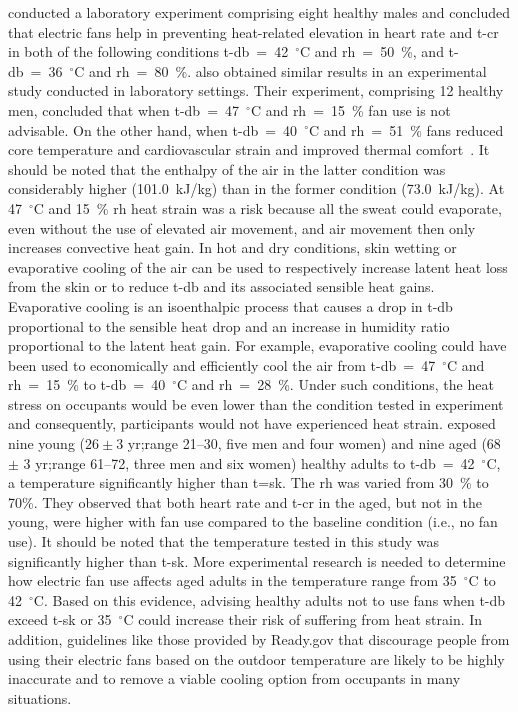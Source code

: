 conducted a laboratory experiment comprising eight healthy males and concluded that electric fans help in preventing heat-related elevation in heart rate and \ac{t-cr} in both of the following conditions \ac{t-db}~=~42~$^{\circ}$C and \ac{rh}~=~50~\%, and \ac{t-db}~=~36~$^{\circ}$C and \ac{rh}~=~80~\%.
 also obtained similar results in an experimental study conducted in laboratory settings.
Their experiment, comprising 12 healthy men, concluded that when \ac{t-db}~=~47~$^{\circ}$C and \ac{rh}~=~15~\% fan use is not advisable.
On the other hand, when \ac{t-db}~=~40~$^{\circ}$C and \ac{rh}~=~51~\% fans reduced core temperature and cardiovascular strain and improved thermal comfort~\cite{Morris2019}.
It should be noted that the enthalpy of the air in the latter condition was considerably higher (101.0~kJ/kg) than in the former condition (73.0~kJ/kg).
At 47~$^{\circ}$C and 15~\% \ac{rh} heat strain was a risk because all the sweat could evaporate, even without the use of elevated air movement, and air movement then only increases convective heat gain.
In hot and dry conditions, skin wetting or evaporative cooling of the air can be used to respectively increase latent heat loss from the skin or to reduce \ac{t-db} and its associated sensible heat gains.
Evaporative cooling is an isoenthalpic process that causes a drop in \ac{t-db} proportional to the sensible heat drop and an increase in humidity ratio proportional to the latent heat gain.
For example, evaporative cooling could have been used to economically and efficiently cool the air from \ac{t-db}~=~47~$^{\circ}$C and \ac{rh}~=~15~\% to \ac{t-db}~=~40~$^{\circ}$C and \ac{rh}~=~28~\%\@.
Under such conditions, the heat stress on occupants would be even lower than the condition tested in  experiment and consequently, participants would not have experienced heat strain.
 exposed nine young ($26 \pm 3$ yr;\@ range 21--30, five men and four women) and nine aged (68 $\pm$ 3 yr;\@ range 61--72, three men and six women) healthy adults to \ac{t-db}~=~42~$^{\circ}$C, a temperature significantly higher than \ac{t=sk}.
The \ac{rh} was varied from 30~\% to 70\%.
They observed that both heart rate and \ac{t-cr} in the aged, but not in the young, were higher with fan use compared to the baseline condition (i.e., no fan use).
It should be noted that the temperature tested in this study was significantly higher than \ac{t-sk}.
More experimental research is needed to determine how electric fan use affects aged adults in the temperature range from 35~$^{\circ}$C to 42~$^{\circ}$C\@.
Based on this evidence, advising healthy adults not to use fans when \ac{t-db} exceed \ac{t-sk} or 35~$^{\circ}$C could increase their risk of suffering from heat strain.
In addition, guidelines like those provided by Ready.gov that discourage people from using their electric fans based on the outdoor temperature are likely to be highly inaccurate and to remove a viable cooling option from occupants in many situations.

